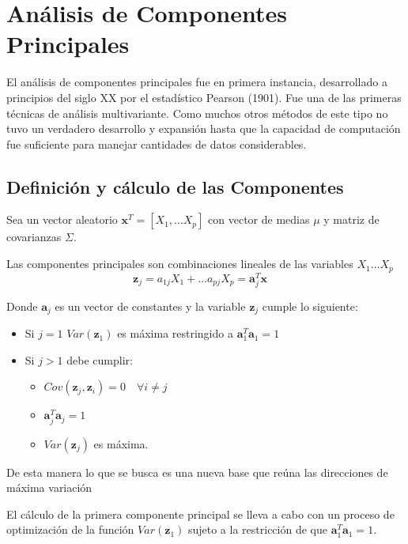 \section{Análisis de Componentes Principales}

\noindent El análisis de componentes principales fue en primera instancia, desarrollado a principios del siglo XX por el estadístico Pearson (1901). Fue una de las primeras técnicas de análisis multivariante. Como muchos otros métodos de este tipo no tuvo un verdadero desarrollo y expansión hasta que la capacidad de computación fue suficiente para manejar cantidades de datos considerables. 

\subsection{Definición y cálculo de las Componentes}

\noindent Sea un vector aleatorio $\textbf{x}^T=[X_1,\ldots X_p]$ con vector de medias $\mu$ y matriz de covarianzas $\Sigma$.
\begin{defi}
Las componentes principales son combinaciones lineales de las variables $X_1 \ldots X_p$
\begin{equation}
\textbf{z}_j=a_{1j}X_1+\ldots a_{pj}X_p=\textbf{a}_j^T\textbf{x}\quad 
\end{equation}

\noindent Donde $\textbf{a}_j$ es un vector de constantes y la variable $\textbf{z}_j$ cumple lo siguiente:
\begin{itemize}
\item Si $j=1$ $Var(\textbf{z}_1)$ es máxima restringido a $\textbf{a}_1^T \textbf{a}_1=1$
\item Si $j>1$ debe cumplir:
\begin{itemize}
\item $Cov(\textbf{z}_j,\textbf{z}_i)=0\quad \forall i\neq j $
\item $\textbf{a}_j^T \textbf{a}_j=1$
\item $Var(\textbf{z}_j)$ es máxima. 
\end{itemize}
\end{itemize}
\noindent De esta manera lo que se busca es una nueva base que reúna las direcciones de máxima variación 
\end{defi}

\noindent El cálculo de la primera componente principal se lleva a cabo con un proceso de optimización de la función $Var(\textbf{z}_1)$ sujeto a la restricción de que $\textbf{a}_1^T\textbf{a}_1=1$. 


